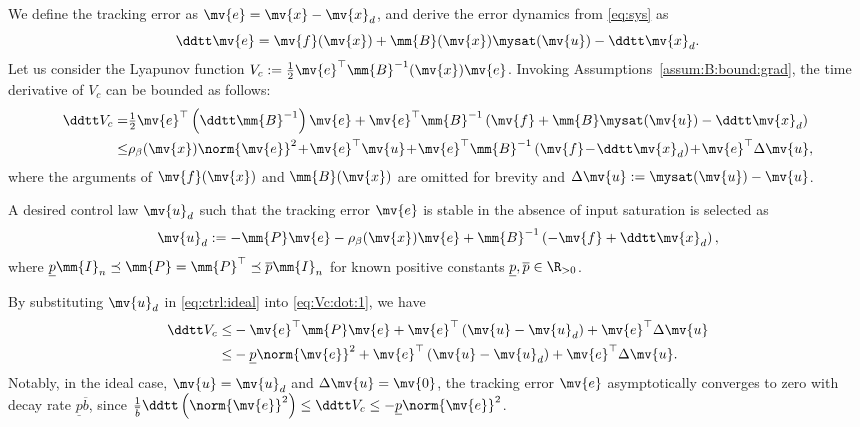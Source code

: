 \documentclass[letterpaper, journal]{IEEEtran}
\begin{document}
We define the tracking error as $\mv{e} = \mv{x} - \mv{x}_d$, and derive the error dynamics from \eqref{eq:sys} as
\begin{equation} \label{eq:error:dyn}
    \ddtt\mv{e}
    =
    \mv{f}(\mv{x}) + \mm{B}(\mv{x})\mysat(\mv{u}) - \ddtt\mv{x}_d
    .
\end{equation}
Let us consider the Lyapunov function $V_c:=\tfrac{1}{2}\mv{e}^\top\mm{B}^{-1}(\mv{x})\mv{e}$.
Invoking Assumptions~\ref{assum:B:bound:grad}, the time derivative of $V_c$ can be bounded as follows:
\begin{align} \label{eq:Vc:dot:1} \nonumber
  \ddtt V_c
  =&
  \tfrac{1}{2}\mv{e}^\top
  \left(
    \ddtt\mm{B}^{-1}
  \right)
  \mv{e}
  +
  \mv{e}^\top\mm{B}^{-1}
  \left(
    \mv{f} + \mm{B}\mysat(\mv{u}) 
    - \ddtt\mv{x}_d
  \right)
  \\
  \le&
  \rho_{\beta}(\mv{x})
  \norm{\mv{e}}^2
  \!+\!
  \mv{e}^\top\mv{u}
  \!+\!
  \mv{e}^\top\mm{B}^{-1}
  \left(
    \mv{f} \!-\! \ddtt\mv{x}_d
  \right)
  \!+\!
  \mv{e}^\top
  \Delta\mv{u}
  ,
\end{align}
where the arguments of $\mv{f}(\mv{x})$ and $\mm{B}(\mv{x})$ are omitted for brevity and $\Delta\mv{u} := \mysat(\mv{u}) - \mv{u}$.

A desired control law $\mv{u}_d$ such that the tracking error $\mv{e}$ is stable in the absence of input saturation is selected as 
\begin{equation} \label{eq:ctrl:ideal}
  \mv{u}_d
  :=
  -
  \mm{P}
  \mv{e}
  - 
  \rho_{\beta}(\mv{x})
  \mv{e}
  +
  \mm{B}^{-1}
  \left(
    - \mv{f} 
    + \ddtt\mv{x}_d
  \right)
  ,
\end{equation}
where $\underline{p}\mm{I}_n \preceq \mm{P}=\mm{P}^\top \preceq \overline{p}\mm{I}_n$ for known positive constants $\underline{p},\overline{p}\in\R_{>0}$.

By substituting $\mv{u}_d$ in \eqref{eq:ctrl:ideal} into \eqref{eq:Vc:dot:1}, we have
\begin{align} \label{eq:Vc:dot:2} 
  \ddtt V_c
  \le &
  -\mv{e}^\top
  \mm{P}
  \mv{e}
  +
  \mv{e}^\top
  \left(
    \mv{u} - \mv{u}_d
  \right)
  +
  \mv{e}^\top
  \Delta\mv{u}
  \\ \nonumber
  \le & 
  -
  \underline{p}\norm{\mv{e}}^2
  +
  \mv{e}^\top
  \left(
    \mv{u} - \mv{u}_d       
  \right)
  +
  \mv{e}^\top
    \Delta\mv{u}
  .
\end{align}
Notably, in the ideal case, \ie $\mv{u} = \mv{u}_d$ and $\Delta\mv{u} = \mv{0}$, the tracking error $\mv{e}$ asymptotically converges to zero with decay rate $\underline{p}\overline{b}$, since 
$
  \tfrac{1}{\overline{b}}
  \ddtt
  \left(
    \norm{\mv{e}}^2
  \right)
  \le
  \ddtt V_c 
  \le 
  -\underline{p}\norm{\mv{e}}^2
$.
\end{document}
